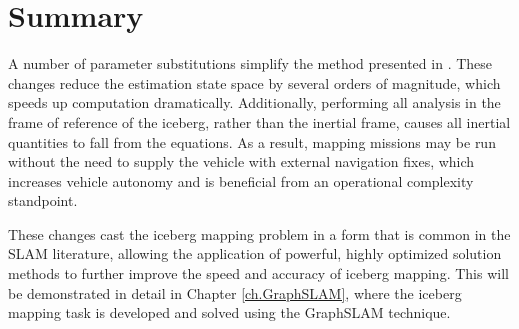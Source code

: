 \section{Summary}

A number of parameter substitutions simplify the method presented in \cite{Kimball2011b}. These changes reduce the estimation state space by several orders of magnitude, which speeds up computation dramatically. Additionally, performing all analysis in the frame of reference of the iceberg, rather than the inertial frame, causes all inertial quantities to fall from the equations. As a result, mapping missions may be run without the need to supply the vehicle with external navigation fixes, which increases vehicle autonomy and is beneficial from an operational complexity standpoint. 

These changes cast the iceberg mapping problem in a form that is common in the SLAM literature, allowing the application of powerful, highly optimized solution methods to further improve the speed and accuracy of iceberg mapping. This will be demonstrated in detail in Chapter \ref{ch.GraphSLAM}, where the iceberg mapping task is developed and solved using the GraphSLAM technique. 

